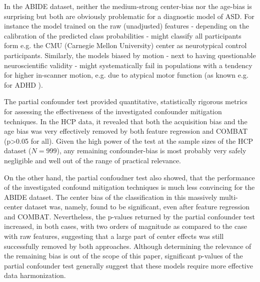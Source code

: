 \documentclass{article}
\begin{document}
In the ABIDE dataset, neither the medium-strong center-bias nor the age-bias is surprising but both are obviously problematic for a diagnostic model of ASD. For instance the model trained on the raw (unadjusted) features - depending on the calibration of the predicted class probabilities - might classify all participants form e.g. the CMU (Carnegie Mellon University) center as neurotypical control participants. Similarly, the models biased by motion - next to having questionable neuroscientific validity - might systematically fail in populations with a tendency for higher in-scanner motion, e.g. due to atypical motor function (as known e.g. for ADHD \citep{eloyan2012automated}).
 
 The partial confounder test provided quantitative, statistically rigorous metrics for assessing the effectiveness of the investigated confounder mitigation techniques. In the HCP data, it revealed that both the acquisition bias and the age bias was very effectively removed by both feature regression and COMBAT (p>0.05 for all). Given the high power of the test at the sample sizes of the HCP dataset ($N=999$), any remaining confounder-bias is most probably very safely negligible and well out of the range of practical relevance.
 
On the other hand, the partial confoudner test also showed, that the performance of the investigated confound mitigation techniques is much less convincing for the ABIDE dataset. The center bias of the classification in this massively multi-center dataset was, namely, found to be significant, even after feature regression and COMBAT. Nevertheless, the p-values returned by the partial confounder test increased, in both cases, with two orders of magnitude as compared to the case with raw features, suggesting that a large part of center effects was still successfully removed by both approaches. Although determining the relevance of the remaining bias is out of the scope of this paper, significant p-values of the partial confounder test generally suggest that these models require more effective data harmonization.
\end{document}
